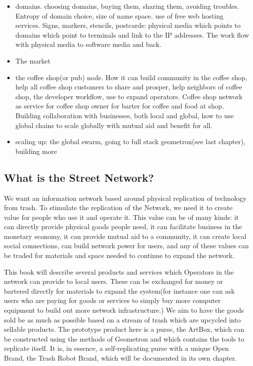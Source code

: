 \begin{itemize}
  \item
  domains.  choosing domains, buying them, sharing them, avoiding troubles. Entropy of domain choice, size of name space. use of free web hosting services.  Signs, markers, stencils, postcards: physical media which points to domains which point to terminals and link to the IP addresses.  The work flow with physical media to software media and back.
  \item
  The market
  \item
  the coffee shop(or pub) node.  How it can build community in the coffee shop, help all coffee shop customers to share and prosper, help neighbors of coffee shop, the developer workflow, use to expand operators.  Coffee shop network as service for coffee shop owner for barter for coffee and food at shop.  Building collaboration with businesses, both local and global, how to use global chains to scale globally with mutual aid and benefit for all.
  \item
  scaling up: the global swarm, going to full stack geometron(see last chapter), building more 
\end{itemize}

\subsection{What is the Street Network?}

We want an information network based around physical replication of technology from trash.  To stimulate the replication of the Network, we need it to create value for people who use it and operate it. This value can be of many kinds: it can directly provide physical goods people need, it can facilitate business in the monetary economy, it can provide mutual aid to a community, it can create local social connections, can build network power for users, and any of these values can be traded for materials and space needed to continue to expand the network.  

This book will describe several products and services which Operators in the network can provide to local users.  These can be exchanged for money or bartered directly for materials to expand the system(for instance one can ask users who are paying for goods or services to simply buy more computer equipment to build out more network infrastructure.)  We aim to have the goods sold be as much as possible based on a stream of trash which are upcycled into sellable products.  The prototype product here is a purse, the ArtBox, which can be constructed using the methods of Geometron and which contains the tools to replicate itself.  It is, in essence, a self-replicating purse with a unique Open Brand, the Trash Robot Brand, which will be documented in its own chapter.  

